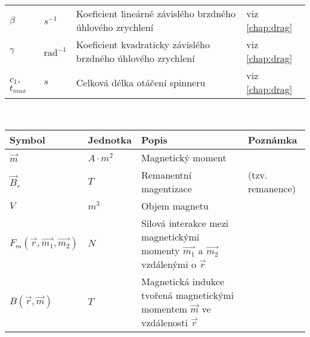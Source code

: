 \documentclass[12pt, a4paper,
 twoside,        %
 openright
]{report}
\begin{document}
\begin{table}[!ht]
\begin{tabularx}{\textwidth}{m{} m{} p{} p{5cm} }
        $\beta$          & $s^{-1}$                  & Koeficient lineárně závislého brzdného úhlového zrychlení     & viz \ref{chap:drag}                            \\
        $\gamma$         & $\text{rad}^{-1}$         & Koeficient kvadraticky závislého brzdného úhlového zrychlení  & viz \ref{chap:drag}                            \\
        $c_1$, $t_{max}$ & $s$                       & Celková délka otáčení spinneru                                & viz \ref{chap:drag}                            \\
    \end{tabularx}

    \vspace{24pt}

     \\
    \begin{tabularx}{\textwidth}{m{} m{} p{} p{4cm} }
        \textbf{Symbol}                      & \textbf{Jednotka}                                                            & \textbf{Popis}                                                                              & \textbf{Poznámka}                      \\
        \hline
        $\vec{m}$                            & $A \cdot m^2$                                                                & Magnetický moment                                                                                                                    \\
        $\vec{B}_r$                          & $T$                                                                          & Remanentní magentizace                                                                      & (tzv. remanence)                       \\
        $V$                                  & $m^3$                                                                        & Objem magnetu                                                                                                                        \\
        $F_m(\vec{r}, \vec{m_1}, \vec{m_2})$ & $N$                                                                          & Silová interakce mezi magnetickými momenty $\vec{m_1}$ a $\vec{m_2}$ vzdálenými o $\vec{r}$ & \cite{magnetic_force}                  \\
        $B(\vec{r}, \vec{m})$                & $T$                                                                          & Magnetická indukce tvořená magnetickými momentem $\vec{m}$ ve vzdálenosti $\vec{r}$         & \cite{magnetic_force, magnetic_torque} \\

\end{tabularx}
\end{table}
\end{document}
